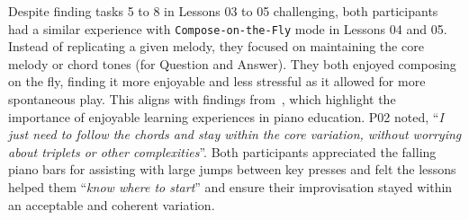 \documentclass{vgtc}                          %
\begin{document}
\par %
Despite finding tasks 5 to 8 in Lessons 03 to 05 challenging, both participants had a similar experience with \texttt{Compose-on-the-Fly} mode in Lessons 04 and 05. Instead of replicating a given melody, they focused on maintaining the core melody or chord tones (for Question and Answer). They both enjoyed composing on the fly, finding it more enjoyable and less stressful as it allowed for more spontaneous play. This aligns with findings from~\cite{jutras2006benefits}, which highlight the importance of enjoyable learning experiences in piano education. P02 noted, ``\textit{I just need to follow the chords and stay within the core variation, without worrying about triplets or other complexities}''. Both participants appreciated the falling piano bars for assisting with large jumps between key presses and felt the lessons helped them ``\textit{know where to start}'' and ensure their improvisation stayed within an acceptable and coherent variation.
\end{document}

